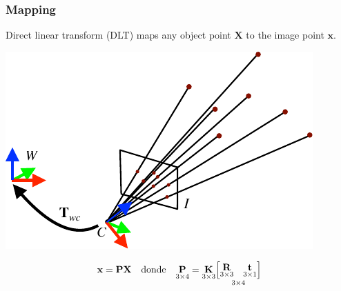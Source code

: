 \begin{frame}
  \frametitle{Mapping}
  Direct linear transform (DLT) maps any object point $\mathbf{X}$ to the image point $\mathbf{x}$.
  \begin{center}
    \includegraphics[width=0.5\columnwidth]{./images/dlt_3d_2d.pdf}
  \end{center}
%
  \begin{equation*}
    \boldsymbol{\mathbf{x}} = \boldsymbol{\mathbf{P}} \boldsymbol{\mathbf{X}} \quad \text{donde} \quad
    \underset{3 \times 4}{\boldsymbol{\mathbf{P}}}=\underset{3 \times 3}{\boldsymbol{\mathbf{K}}}\underset{3 \times 4}{\begin{bmatrix} \underset{3 \times 3}{\boldsymbol{\mathbf{R}}} & \underset{3 \times 1}{\boldsymbol{\mathbf{t}}}\end{bmatrix}}
  \end{equation*}
%
\end{frame}



